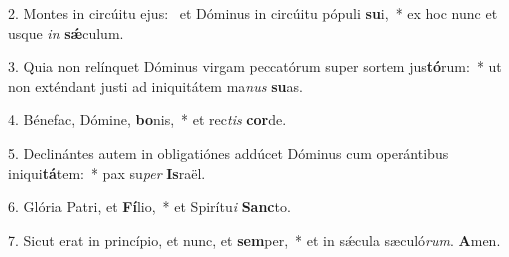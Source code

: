 2. Montes in circúitu ejus: \dag\  et Dóminus in circúitu pópuli \textbf{su}i,~*  ex hoc nunc et usque \textit{in} \textbf{sǽ}culum.\

3. Quia non relínquet Dóminus virgam peccatórum super sortem jus\textbf{tó}rum:~*  ut non exténdant justi ad iniquitátem ma\textit{nus} \textbf{su}as.\

4. Bénefac, Dómine, \textbf{bo}nis,~*  et rec\textit{tis} \textbf{cor}de.\

5. Declinántes autem in obligatiónes addúcet Dóminus cum operántibus iniqui\textbf{tá}tem:~*  pax su\textit{per} \textbf{Is}raël.\

6. Glória Patri, et \textbf{Fí}lio,~*  et Spirítu\textit{i} \textbf{Sanc}to.\

7. Sicut erat in princípio, et nunc, et \textbf{sem}per,~*  et in sǽcula sæculó\textit{rum}. \textbf{A}men.\

